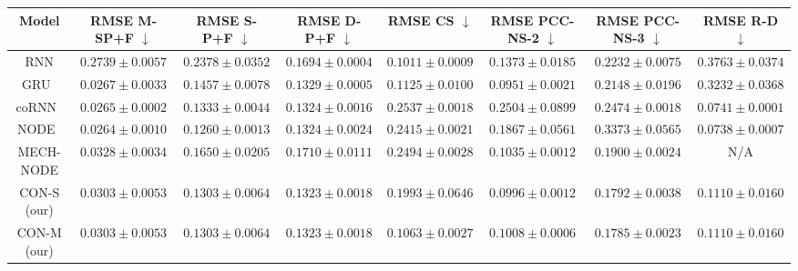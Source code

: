 \begin{landscape}
\begin{table}
    \centering
    \begin{small}
    \setlength\tabcolsep{2pt}
    \begin{tabular}{c c c c c c c c}
         \toprule
         \textbf{Model} & \textbf{RMSE M-SP+F} $\downarrow$ & \textbf{RMSE S-P+F} $\downarrow$ & \textbf{RMSE D-P+F} $\downarrow$ & \textbf{RMSE CS} $\downarrow$ & \textbf{RMSE PCC-NS-2} $\downarrow$ & \textbf{RMSE PCC-NS-3} $\downarrow$ & \textbf{RMSE R-D} $\downarrow$ \\
         \midrule
         RNN & $0.2739 \pm 0.0057$ & $0.2378 \pm 0.0352$ & $0.1694 \pm 0.0004$ & $\mathbf{0.1011 \pm 0.0009}$ & $0.1373 \pm 0.0185$ & $0.2232 \pm 0.0075$ & $0.3763 \pm 0.0374$\\
         GRU~\cite{cho2014learning} & $0.0267 \pm 0.0033$ & $0.1457 \pm 0.0078$ & $0.1329 \pm 0.0005$ & $0.1125 \pm 0.0100$ & $\mathbf{0.0951 \pm 0.0021}$ & $0.2148 \pm 0.0196$ & $0.3232 \pm 0.0368$\\
         coRNN~\cite{rusch2020coupled} & $\mathbf{0.0265 \pm 0.0002}$ & $0.1333 \pm 0.0044$ & $0.1324 \pm 0.0016$ & $0.2537 \pm 0.0018$ & $0.2504 \pm 0.0899$ & $0.2474 \pm 0.0018$ & $\mathbf{0.0741 \pm 0.0001}$\\
         NODE~\cite{chen2018neural} & $\mathbf{0.0264 \pm 0.0010}$ & $\mathbf{0.1260 \pm 0.0013}$ & $0.1324 \pm 0.0024$ & $0.2415 \pm 0.0021$ & $0.1867 \pm 0.0561$ & $0.3373 \pm 0.0565$ & $\mathbf{0.0738 \pm 0.0007}$\\
         MECH-NODE & $0.0328 \pm 0.0034$ & $0.1650 \pm 0.0205$ & $0.1710 \pm 0.0111$ & $0.2494 \pm 0.0028$ & $0.1035 \pm 0.0012$ & $0.1900 \pm 0.0024$ & N/A\\
         CON-S (our) & $0.0303 \pm 0.0053$ & $0.1303 \pm 0.0064$ & $0.1323 \pm 0.0018$ & $0.1993 \pm 0.0646$ & $0.0996 \pm 0.0012$ & $0.1792 \pm 0.0038$ & $0.1110 \pm 0.0160$\\
         CON-M (our) & $0.0303 \pm 0.0053$ & $0.1303 \pm 0.0064$ & $0.1323 \pm 0.0018$ & $0.1063 \pm 0.0027$ & $0.1008 \pm 0.0006$ & $\mathbf{0.1785 \pm 0.0023}$ & $0.1110 \pm 0.0160$\\

\end{tabular}
\end{small}
\end{table}
\end{landscape}
